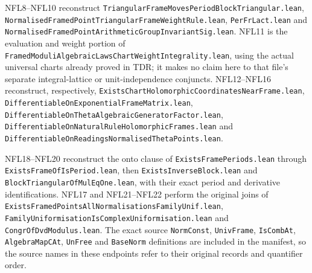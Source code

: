 \documentclass[11pt,a4paper]{article}
\numberwithin{equation}{section}
\theoremstyle{remark}\newtheorem{remark}[theorem]{Remark}
\begin{document}
NFL8--NFL10 reconstruct \texttt{Triangular\allowbreak{}Frame\allowbreak{}Moves\allowbreak{}Period\allowbreak{}Block\allowbreak{}Triangular.lean},
\texttt{Normalised\allowbreak{}Framed\allowbreak{}Point\allowbreak{}Triangular\allowbreak{}Frame\allowbreak{}Weight\allowbreak{}Rule.lean},
\texttt{Per\allowbreak Fr\allowbreak Lact.\allowbreak lean} and
\texttt{Normalised\allowbreak{}Framed\allowbreak{}Point\allowbreak{}Arithmetic\allowbreak{}Group\allowbreak{}Invariant\allowbreak{}Sig.lean}.
NFL11 is the evaluation and weight portion of
\texttt{Framed\allowbreak{}Moduli\allowbreak{}Algebraic\allowbreak{}Laws\allowbreak{}Chart\allowbreak{}Weight\allowbreak{}Integrality.lean},
using the actual universal charts already proved in TDR;
it makes no claim here to that file's separate integral-lattice
or unit-independence conjuncts.
NFL12--NFL16 reconstruct, respectively,
\texttt{Exists\allowbreak{}Chart\allowbreak{}Holomorphic\allowbreak{}Coordinates\allowbreak{}Near\allowbreak{}Frame.lean},
\texttt{Differentiable\allowbreak{}On\allowbreak{}Exponential\allowbreak{}Frame\allowbreak{}Matrix.lean},
\texttt{Differentiable\allowbreak{}On\allowbreak{}Theta\allowbreak{}Algebraic\allowbreak{}Generator\allowbreak{}Factor.lean},
\texttt{Differentiable\allowbreak{}On\allowbreak{}Natural\allowbreak{}Rule\allowbreak{}Holomorphic\allowbreak{}Frames.lean} and
\texttt{Differentiable\allowbreak{}On\allowbreak{}Readings\allowbreak{}Normalised\allowbreak{}Theta\allowbreak{}Points.lean}.

NFL18--NFL20 reconstruct the onto clause of
\texttt{Exists\allowbreak Frame\allowbreak Periods.\allowbreak lean} through
\texttt{Exists\allowbreak Frame\allowbreak Of\allowbreak Is\allowbreak Period.\allowbreak lean}, then
\texttt{Exists\allowbreak Inverse\allowbreak Block.\allowbreak lean} and
\texttt{Block\allowbreak Triangular\allowbreak Of\allowbreak Mul\allowbreak Eq\allowbreak One.\allowbreak lean}, with their exact period
and derivative identifications.
NFL17 and NFL21--NFL22 perform the original joins of
\texttt{Exists\allowbreak{}Framed\allowbreak{}Points\allowbreak{}All\allowbreak{}Normalisations\allowbreak{}Family\allowbreak{}Unif.lean},
\texttt{Family\allowbreak{}Uniformisation\allowbreak{}Is\allowbreak{}Complex\allowbreak{}Uniformisation.lean} and
\texttt{Congr\allowbreak Of\allowbreak Dvd\allowbreak Modulus.\allowbreak lean}.  The exact source
\texttt{Norm\allowbreak Const}, \texttt{Univ\allowbreak Frame}, \texttt{Is\allowbreak Comb\allowbreak At},
\texttt{Algebra\allowbreak Map\allowbreak CAt}, \texttt{Un\allowbreak Free} and \texttt{Base\allowbreak Norm}
definitions are included in the manifest, so the source names
in these endpoints refer to their original records and
quantifier order.
\end{document}
